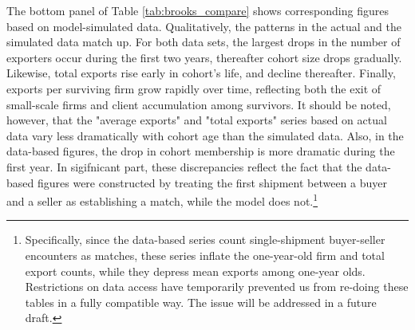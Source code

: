 \documentclass[12pt]{article}
\begin{document}
The bottom panel of Table \ref{tab:brooks_compare} shows corresponding
figures based on model-simulated data. Qualitatively, the patterns in the
actual and the simulated data match up. For both data sets, the largest
drops in the number of exporters occur during the first two years,
thereafter cohort size drops gradually. Likewise, total exports rise early
in cohort's life, and decline thereafter. Finally, exports per surviving
firm grow rapidly over time, reflecting both the exit of small-scale firms
and client accumulation among survivors. It should be noted, however, that
the "average exports" and "total exports" series based on actual data vary
less dramatically with cohort age than the simulated data. Also, in the
data-based figures, the drop in cohort membership is more dramatic during
the first year. In sigifnicant part, these discrepancies reflect the fact
that the data-based figures were constructed by treating the first shipment
between a buyer and a seller as establishing a match, while the model does
not.\footnote{%
Specifically, since the data-based series count single-shipment buyer-seller
encounters as matches, these series inflate the one-year-old firm and total
export counts, while they depress mean exports among one-year olds.
Restrictions on data access have temporarily prevented us from re-doing
these tables in a fully compatible way. The issue will be addressed in a
future draft.\medskip}
\end{document}

